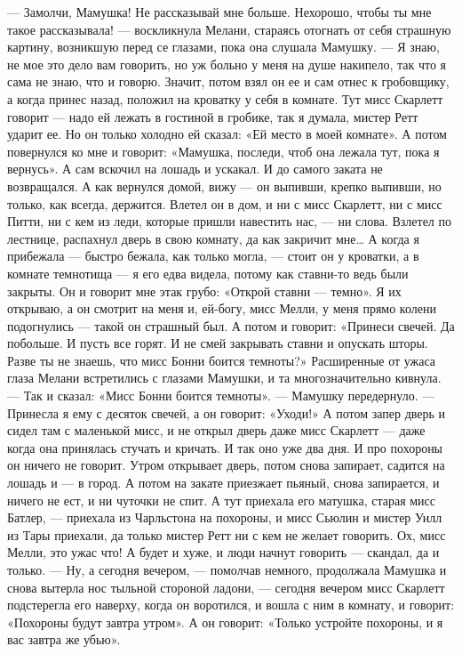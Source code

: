 — Замолчи, Мамушка! Не рассказывай мне больше. Нехорошо, чтобы ты мне такое рассказывала! — воскликнула Мелани, стараясь отогнать от себя страшную картину, возникшую перед се глазами, пока она слушала Мамушку.
— Я знаю, не мое это дело вам говорить, но уж больно у меня на душе накипело, так что я сама не знаю, что и говорю. Значит, потом взял он ее и сам отнес к гробовщику, а когда принес назад, положил на кроватку у себя в комнате. Тут мисс Скарлетт говорит — надо ей лежать в гостиной в гробике, так я думала, мистер Ретт ударит ее. Но он только холодно ей сказал: «Ей место в моей комнате». А потом повернулся ко мне и говорит: «Мамушка, последи, чтоб она лежала тут, пока я вернусь». А сам вскочил на лошадь и ускакал. И до самого заката не возвращался. А как вернулся домой, вижу — он выпивши, крепко выпивши, но только, как всегда, держится. Влетел он в дом, и ни с мисс Скарлетт, ни с мисс Питти, ни с кем из леди, которые пришли навестить нас, — ни слова. Взлетел по лестнице, распахнул дверь в свою комнату, да как закричит мне… А когда я прибежала — быстро бежала, как только могла, — стоит он у кроватки, а в комнате темнотища — я его едва видела, потому как ставни-то ведь были закрыты.
Он и говорит мне этак грубо: «Открой ставни — темно». Я их открываю, а он смотрит на меня и, ей-богу, мисс Мелли, у меня прямо колени подогнулись — такой он страшный был. А потом и говорит: «Принеси свечей. Да побольше. И пусть все горят. И не смей закрывать ставни и опускать шторы. Разве ты не знаешь, что мисс Бонни боится темноты?» Расширенные от ужаса глаза Мелани встретились с глазами Мамушки, и та многозначительно кивнула.
— Так и сказал: «Мисс Бонни боится темноты». — Мамушку передернуло. — Принесла я ему с десяток свечей, а он говорит:
«Уходи!» А потом запер дверь и сидел там с маленькой мисс, и не открыл дверь даже мисс Скарлетт — даже когда она принялась стучать и кричать. И так оно уже два дня. И про похороны он ничего не говорит. Утром открывает дверь, потом снова запирает, садится на лошадь и — в город. А потом на закате приезжает пьяный, снова запирается, и ничего не ест, и ни чуточки не спит. А тут приехала его матушка, старая мисс Батлер, — приехала из Чарльстона на похороны, и мисс Сьюлин и мистер Уилл из Тары приехали, да только мистер Ретт ни с кем не желает говорить. Ох, мисс Мелли, это ужас что! А будет и хуже, и люди начнут говорить — скандал, да и только.
— Ну, а сегодня вечером, — помолчав немного, продолжала Мамушка и снова вытерла нос тыльной стороной ладони, — сегодня вечером мисс Скарлетт подстерегла его наверху, когда он воротился, и вошла с ним в комнату, и говорит: «Похороны будут завтра утром». А он говорит: «Только устройте похороны, и я вас завтра же убью».
